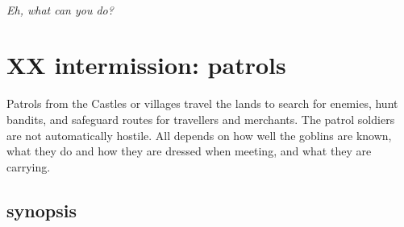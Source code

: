 \

\noindent \emph{Eh, what can you do?} 




































\clearpage
\section*{XX intermission: patrols}


Patrols from the Castles or villages travel the lands to search for enemies, hunt bandits, and safeguard routes for travellers and merchants. The patrol soldiers are not automatically hostile. All depends on how well the goblins are known, what they do and how they are dressed when meeting, and what they are carrying.


\subsection*{synopsis}

